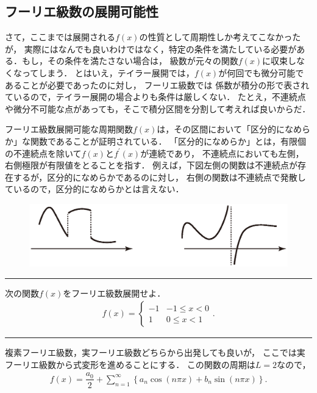 \subsection{フーリエ級数の展開可能性}
%
さて，ここまでは展開される$f(x)$の性質として周期性しか考えてこなかったが，
実際にはなんでも良いわけではなく，特定の条件を満たしている必要がある．もし，その条件を満たさない場合は，
級数が元々の関数$f(x)$に収束しなくなってしまう．
とはいえ，テイラー展開では，$f\left(x\right)$が何回でも微分可能であることが必要であったのに対し，
フーリエ級数では
係数が積分の形で表されているので，テイラー展開の場合よりも条件は厳しくない．
たとえ，不連続点や微分不可能な点があっても，そこで積分区間を分割して考えれば良いからだ．

フーリエ級数展開可能な周期関数$f(x)$は，その区間において「区分的になめらか」な関数であることが証明されている．
「区分的になめらか」とは，有限個の不連続点を除いて$f(x)$と$f^{\prime}(x)$が連続であり，
不連続点においても左側，右側極限が有限値をとることを指す．
例えば，下図左側の関数は不連続点が存在するが，区分的になめらかであるのに対し，
右側の関数は不連続点で発散しているので，区分的になめらかとは言えない．
\begin{figure}[htbp]
 \includegraphics[width=1.0\linewidth]{figures/fourier_smooth.eps} 
\end{figure}
%
\newpage
%
\hrule
\reidai
次の関数$f(x)$をフーリエ級数展開せよ．
\begin{align}
  f\left(x\right) =
  \begin{cases}
    -1 & -1 \leq x < 0 \\
     1 & 0  \leq x < 1 
  \end{cases}. 
\end{align}
\vspace*{.2cm}
\hrule
\vspace*{.2cm}
複素フーリエ級数，実フーリエ級数どちらから出発しても良いが，
ここでは実フーリエ級数から式変形を進めることにする．
この関数の周期は$L=2$なので，
\begin{align}
 f\left(x\right) = \dfrac{a_0}{2} 
                   + \sum_{n=1}^{\infty}\left\{a_n \cos\left(n\pi x\right)
                                             +b_n \sin\left(n\pi x\right)\right\}.
\end{align}
